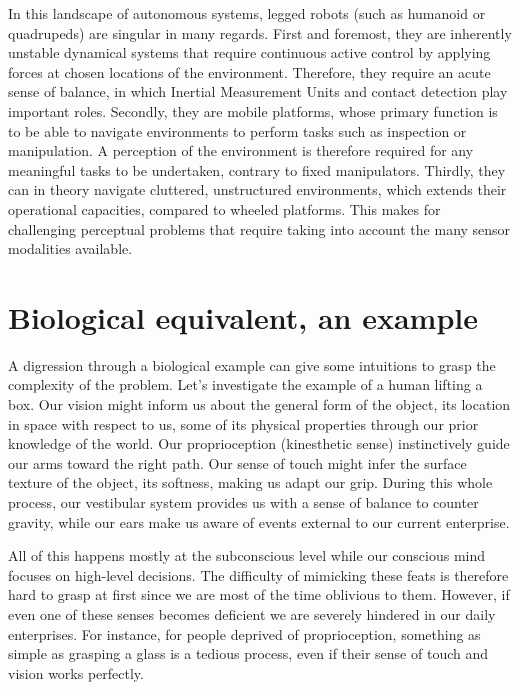 In this landscape of autonomous systems, legged robots (such as humanoid or quadrupeds) are singular in many regards. 
First and foremost, they are inherently unstable dynamical systems that require continuous active control by applying forces at chosen locations of the environment. 
Therefore, they require an acute sense of balance, in which Inertial Measurement Units and contact detection play important roles. 
Secondly, they are mobile platforms, whose primary function is to be able to navigate environments to perform tasks such as inspection or manipulation.
A perception of the environment is therefore required for any meaningful tasks to be undertaken, contrary to fixed manipulators.
Thirdly, they can in theory navigate cluttered, unstructured environments, which extends their operational capacities, compared to wheeled platforms.
This makes for challenging perceptual problems that require taking into account the many sensor modalities available.


\section{Biological equivalent, an example}

A digression through a biological example can give some intuitions to grasp the complexity of the problem. 
Let's investigate the example of a human lifting a box. Our vision might inform us about the general form of the object, 
its location in space with respect to us, some of its physical properties through our prior knowledge of the world. Our proprioception (kinesthetic sense) 
instinctively guide our arms toward the right path. Our sense of touch might infer the surface texture of the object,  its softness, making us 
adapt our grip. During this whole process, our vestibular system provides us with a sense of balance to counter gravity, while our ears 
make us aware of events external to our current enterprise.

All of this happens mostly at the subconscious level while our conscious mind focuses on high-level decisions.
The difficulty of mimicking these feats is therefore hard to grasp at first since we are most of the time oblivious to them.
However, if even one of these senses becomes deficient we are severely hindered in our daily enterprises. For instance, for people deprived
of proprioception, something as simple as grasping a glass is a tedious process, even if their sense of touch and vision works perfectly.


